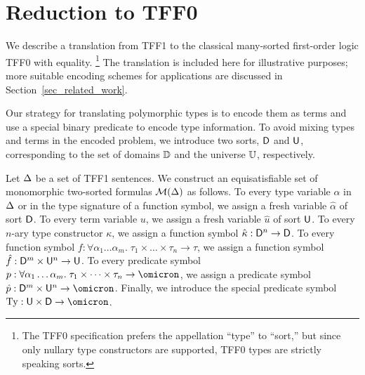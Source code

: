\section{Reduction to TFF0} \label{sec:trans}

We describe a translation from TFF1 to the classical many-sorted first-order logic TFF0
with equality.%
\footnote{The TFF0 specification \cite{TFF0} prefers the appellation ``type'' to
``sort,'' but since only nullary type constructors are supported, TFF0 types are
strictly speaking sorts.}
The translation is included here for illustrative purposes; more suitable
encoding schemes for applications are discussed in
Section~\ref{sec_related_work}.

Our strategy for translating polymorphic types is to encode them as terms and
use a special binary predicate to encode type information.
%
To avoid mixing types
and terms in the encoded problem, we introduce two sorts, $\mathsf{D}$ and $\mathsf{U}$,
corresponding to the set of domains $\mathbb{D}$ and the universe $\mathbb{U}$,
respectively.

Let $\mathrm{\Delta}$ be a set of TFF1 sentences.
We construct an equisatisfiable set of monomorphic two-sorted
formulas $\mathcal{M}(\mathrm{\Delta})$ as follows.
%
To every type variable $\alpha$ in $\mathrm{\Delta}$ or in the type signature of a function
symbol, we assign a fresh variable $\hat{\alpha}$ of sort $\mathsf{D}$.
To every term variable $u$, we assign
a fresh variable $\hat{u}$ of sort $\mathsf{U}$.
To every $n$-ary type constructor $\kappa$, we assign
a function symbol $\hat{\kappa} : \mathsf{D}^n \to \mathsf{D}$.
To every function symbol $f : \forall \alpha_1\dots\alpha_m .\; \tau_1 \times \dots \times \tau_n \to \tau$,
we assign a function symbol $\hat{f} : \mathsf{D}^m \times \mathsf{U}^n \to \mathsf{U}$.
To every predicate symbol $p : \forall \alpha_1\dots\alpha_m .\; \tau_1 \times \dots \times \tau_n \to \omicron$,
we assign a predicate symbol $\hat{p} : \typ^m \times \und^n \to \omicron$.
Finally, we introduce the special predicate symbol $\typeof : \und \times \typ \to \omicron$.

